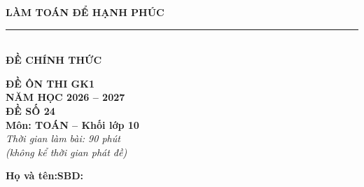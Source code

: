 \documentclass[12pt,a4paper]{article}
\begin{document}
\noindent
\begin{minipage}[c]{0.38\textwidth}
    \centering
    \textbf{LÀM TOÁN ĐỂ HẠNH PHÚC}\\[-2pt]
    \rule{3.2cm}{0.6pt}\\[4pt]
    \textbf{ĐỀ CHÍNH THỨC}
\end{minipage}\hfill
\begin{minipage}[c]{0.35\textwidth}
    \centering
    \textbf{ĐỀ ÔN THI GK1}\\
    \textbf{NĂM HỌC 2026 -- 2027}\\[2pt]
    \textbf{ĐỀ SỐ 24}\\
    \textbf{Môn: TOÁN -- Khối lớp 10}\\
    \textit{\small Thời gian làm bài: 90 phút\\(không kể thời gian phát đề)}
\end{minipage}

\vspace{0.05cm}
\noindent
\begin{minipage}[b]{0.78\textwidth}
    \textbf{Họ và tên:}\dotfill\textbf{SBD:}\makebox[3.5cm]{\dotfill}
\end{minipage}\hfill
\begin{minipage}[b]{0.20\textwidth}
    \hfill
    \setlength{\fboxrule}{0.8pt}%
\end{minipage}
\vspace{0.05cm}
\end{document}
